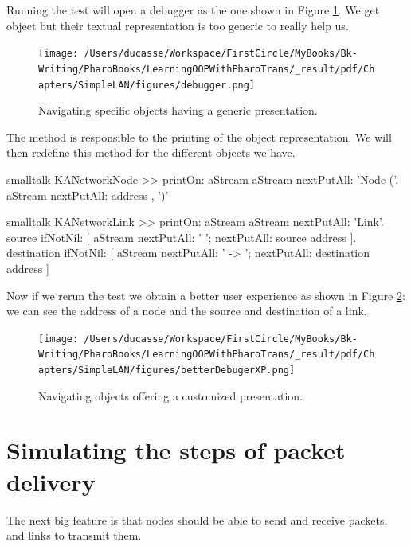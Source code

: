 \documentclass[10pt,twoside,english]{_support/latex/sbabook/sbabook}
\begin{document}
Running the test will open a debugger as the one shown in Figure \ref{debugger}. We get object but their textual representation is too generic to really help us. 


\begin{figure}

\begin{center}
\texttt{[image: /Users/ducasse/Workspace/FirstCircle/MyBooks/Bk-Writing/PharoBooks/LearningOOPWithPharoTrans/\_result/pdf/Chapters/SimpleLAN/figures/debugger.png]}\caption{Navigating specific objects having a generic presentation.\label{debugger}}\end{center}
\end{figure}


The method  is responsible to the printing of the object representation. We will then redefine this method for the different objects we have.

\begin{displaycode}{smalltalk}
KANetworkNode >> printOn: aStream
	aStream nextPutAll: 'Node ('.
	aStream nextPutAll: address , ')'
\end{displaycode}

\begin{displaycode}{smalltalk}
KANetworkLink >> printOn: aStream
	aStream nextPutAll: 'Link'.
	source
		ifNotNil: [ aStream
				nextPutAll: ' ';
				nextPutAll: source address ].
	destination
		ifNotNil: [ aStream
				nextPutAll: ' -> ';
				nextPutAll: destination address ]
\end{displaycode}

Now if we rerun the test we obtain a better user experience as shown in Figure \ref{debuggerXP}: we can see the address of a node and the source and destination of a link.


\begin{figure}

\begin{center}
\texttt{[image: /Users/ducasse/Workspace/FirstCircle/MyBooks/Bk-Writing/PharoBooks/LearningOOPWithPharoTrans/\_result/pdf/Chapters/SimpleLAN/figures/betterDebugerXP.png]}\caption{Navigating objects offering a customized presentation.\label{debuggerXP}}\end{center}
\end{figure}

\section{Simulating the steps of packet delivery}
The next big feature is that nodes should be able to send and receive packets, and links to transmit them.
\end{document}
